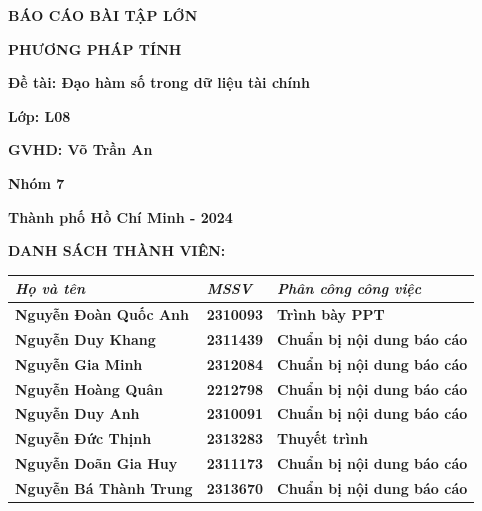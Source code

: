\documentclass[12pt,a4paper]{report}
\begin{document}
\begin{titlepage}
\begin{center}
    \vspace{10pt}
    \fontsize{18pt}{17pt}\selectfont 
    \textbf{BÁO CÁO BÀI TẬP LỚN} 
    
    \vspace{7pt}
    \textbf{PHƯƠNG PHÁP TÍNH}
\end{center}

\begin{center}
    \fontsize{18pt}{17pt}\selectfont 
    \textbf{\textrm{Đề tài: Đạo hàm số trong dữ liệu tài chính}}
\end{center}

\begin{center}
    \vspace{15pt}
\textbf{Lớp: L08}
\end{center}

\begin{center}
    \vspace{15pt}
\textbf{GVHD: Võ Trần An}
\end{center}

\begin{center}
\vspace{15pt}
\textbf{Nhóm 7}
\end{center}

\vspace{10pt}

\vfill
\centerline{\bf Thành phố Hồ Chí Minh - 2024}

\vspace{1cm}
\end{titlepage}
\textbf{DANH SÁCH THÀNH VIÊN:}
\begin{table}[h]
    \begin{tabular}{|l|l|l|}
    \hline
    \textit{\textbf{Họ và tên}}   & \textit{\textbf{MSSV}} & \textit{\textbf{Phân công công việc}} \\ \hline
    \textbf{Nguyễn Đoàn Quốc Anh} & \textbf{2310093}       & \textbf{Trình bày PPT}                \\ \hline
    \textbf{Nguyễn Duy Khang}     & \textbf{2311439}       & \textbf{Chuẩn bị nội dung báo cáo}    \\ \hline
    \textbf{Nguyễn Gia Minh}      & \textbf{2312084}       & \textbf{Chuẩn bị nội dung báo cáo}    \\ \hline
    \textbf{Nguyễn Hoàng Quân}    & \textbf{2212798}       & \textbf{Chuẩn bị nội dung báo cáo}    \\ \hline
    \textbf{Nguyễn Duy Anh}       & \textbf{2310091}       & \textbf{Chuẩn bị nội dung báo cáo}    \\ \hline
    \textbf{Nguyễn Đức Thịnh}     & \textbf{2313283}       & \textbf{Thuyết trình}                 \\ \hline
    \textbf{Nguyễn Doãn Gia Huy}  & \textbf{2311173}       & \textbf{Chuẩn bị nội dung báo cáo}    \\ \hline
    \textbf{Nguyễn Bá Thành Trung}  & \textbf{2313670}       & \textbf{Chuẩn bị nội dung báo cáo}    \\ \hline
    \end{tabular}
\end{table}
\end{document}
